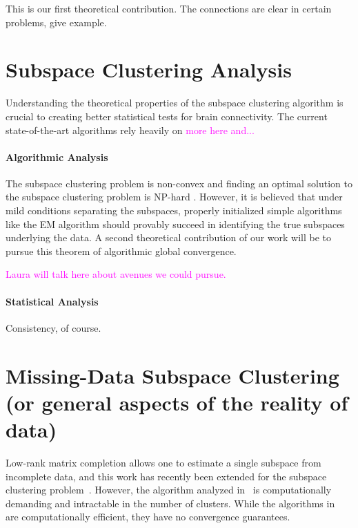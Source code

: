 \documentclass[times,11pt]{article} %
\newcommand{\laura}{\textcolor{magenta}}
\begin{document}
This is our first theoretical contribution. The connections are clear in certain problems, give example.

\section{Subspace Clustering Analysis} Understanding the theoretical properties of the subspace clustering algorithm is crucial to creating better statistical tests for brain connectivity. The current state-of-the-art algorithms rely heavily on \laura{more here and...}


\paragraph{Algorithmic Analysis} The subspace clustering problem is non-convex and finding an optimal solution to the subspace clustering problem is NP-hard \cite{vidaltutorial}. However, it is believed that under mild conditions separating the subspaces, properly initialized simple algorithms like the EM algorithm should provably succeed in identifying the true subspaces underlying the data. A second theoretical contribution of our work will be to pursue this theorem of algorithmic global convergence.

\laura{Laura will talk here about avenues we could pursue. }

\paragraph{Statistical Analysis} Consistency, of course.



\section{Missing-Data Subspace Clustering (or general aspects of the reality of data)}


Low-rank matrix completion allows one to estimate a single subspace from incomplete data, and this work has recently been extended for the subspace clustering problem~\cite{hrmc, balzano2012ssp, pimentel2014}. However, the algorithm analyzed in~\cite{hrmc} is computationally demanding and intractable in the number of clusters. While the algorithms in~\cite{balzano2012ssp, pimentel2014} are computationally efficient, they have no convergence guarantees. 
\end{document}

